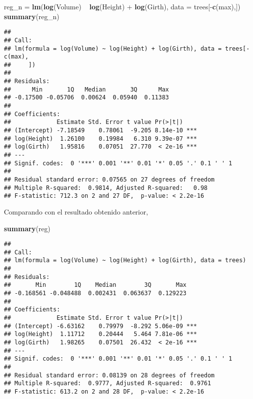 \documentclass[]{article}
\newenvironment{Shaded}{\begin{snugshade}}{\end{snugshade}}
\newcommand{\KeywordTok}[1]{\textcolor[rgb]{0.13,0.29,0.53}{\textbf{{#1}}}}
\newcommand{\DataTypeTok}[1]{\textcolor[rgb]{0.13,0.29,0.53}{{#1}}}
\newcommand{\StringTok}[1]{\textcolor[rgb]{0.31,0.60,0.02}{{#1}}}
\newcommand{\NormalTok}[1]{{#1}}
\begin{document}
\begin{Shaded}
\begin{Highlighting}[]
\NormalTok{reg_n =}\StringTok{ }\KeywordTok{lm}\NormalTok{(}\KeywordTok{log}\NormalTok{(Volume) ~}\StringTok{ }\KeywordTok{log}\NormalTok{(Height) +}\StringTok{ }\KeywordTok{log}\NormalTok{(Girth), }\DataTypeTok{data =} \NormalTok{trees[-}\KeywordTok{c}\NormalTok{(max),])}
\KeywordTok{summary}\NormalTok{(reg_n)}
\end{Highlighting}
\end{Shaded}

\begin{verbatim}
## 
## Call:
## lm(formula = log(Volume) ~ log(Height) + log(Girth), data = trees[-c(max), 
##     ])
## 
## Residuals:
##      Min       1Q   Median       3Q      Max 
## -0.17500 -0.05706  0.00624  0.05940  0.11383 
## 
## Coefficients:
##             Estimate Std. Error t value Pr(>|t|)    
## (Intercept) -7.18549    0.78061  -9.205 8.14e-10 ***
## log(Height)  1.26100    0.19984   6.310 9.39e-07 ***
## log(Girth)   1.95816    0.07051  27.770  < 2e-16 ***
## ---
## Signif. codes:  0 '***' 0.001 '**' 0.01 '*' 0.05 '.' 0.1 ' ' 1
## 
## Residual standard error: 0.07565 on 27 degrees of freedom
## Multiple R-squared:  0.9814, Adjusted R-squared:   0.98 
## F-statistic: 712.3 on 2 and 27 DF,  p-value: < 2.2e-16
\end{verbatim}

Comparando con el resultado obtenido anterior,

\begin{Shaded}
\begin{Highlighting}[]
\KeywordTok{summary}\NormalTok{(reg)}
\end{Highlighting}
\end{Shaded}

\begin{verbatim}
## 
## Call:
## lm(formula = log(Volume) ~ log(Height) + log(Girth), data = trees)
## 
## Residuals:
##       Min        1Q    Median        3Q       Max 
## -0.168561 -0.048488  0.002431  0.063637  0.129223 
## 
## Coefficients:
##             Estimate Std. Error t value Pr(>|t|)    
## (Intercept) -6.63162    0.79979  -8.292 5.06e-09 ***
## log(Height)  1.11712    0.20444   5.464 7.81e-06 ***
## log(Girth)   1.98265    0.07501  26.432  < 2e-16 ***
## ---
## Signif. codes:  0 '***' 0.001 '**' 0.01 '*' 0.05 '.' 0.1 ' ' 1
## 
## Residual standard error: 0.08139 on 28 degrees of freedom
## Multiple R-squared:  0.9777, Adjusted R-squared:  0.9761 
## F-statistic: 613.2 on 2 and 28 DF,  p-value: < 2.2e-16
\end{verbatim}
\end{document}
